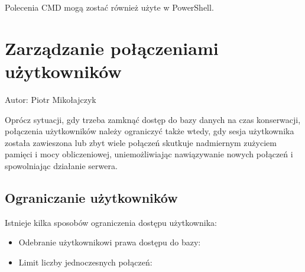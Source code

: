 \documentclass[a4paper,11pt,polish]{sphinxmanual}
\begin{document}
\sphinxAtStartPar
Polecenia CMD mogą zostać również użyte w PowerShell.


\section{Zarządzanie połączeniami użytkowników}
\label{\detokenize{Kontrola_i_konserwacja/kontrola_i_konserwacja:zarzadzanie-polaczeniami-uzytkownikow}}
\sphinxAtStartPar
Autor: Piotr Mikołajczyk

\sphinxAtStartPar
Oprócz sytuacji, gdy trzeba zamknąć dostęp do bazy danych na czas konserwacji, połączenia użytkowników należy ograniczyć także wtedy, gdy sesja użytkownika została zawieszona lub zbyt wiele połączeń skutkuje nadmiernym zużyciem pamięci i mocy obliczeniowej, uniemożliwiając nawiązywanie nowych połączeń i spowolniając działanie serwera.


\subsection{Ograniczanie użytkowników}
\label{\detokenize{Kontrola_i_konserwacja/kontrola_i_konserwacja:ograniczanie-uzytkownikow}}
\sphinxAtStartPar
Istnieje kilka sposobów ograniczenia dostępu użytkownika:
\begin{itemize}
\item {} 
\sphinxAtStartPar
Odebranie użytkownikowi prawa dostępu do bazy:
\begin{quote}

\begin{sphinxVerbatim}[commandchars=\\\{\}]
\end{sphinxVerbatim}
\end{quote}

\item {} 
\sphinxAtStartPar
Limit liczby jednoczesnych połączeń:
\begin{quote}

\begin{sphinxVerbatim}[commandchars=\\\{\}]
\end{sphinxVerbatim}
\end{quote}

\end{itemize}
\end{document}
